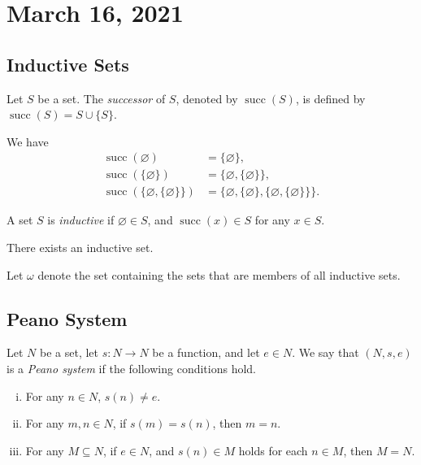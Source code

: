 \documentclass[11pt]{article}
\DeclareMathOperator{\suc}{succ}
\begin{document}
\section{March 16, 2021}
\subsection{Inductive Sets}
\begin{definition}
  Let $S$ be a set.
  The \emph{successor} of $S$, denoted by $\suc(S)$, is defined by $\suc(S) = S \cup \{S\}$.
\end{definition}

\begin{example}
  We have
  \begin{align*}
    \suc(\varnothing) &= \{\varnothing\}, \\
    \suc(\{\varnothing\}) &= \{\varnothing, \{\varnothing\}\}, \\
    \suc(\{\varnothing, \{\varnothing\}\}) &= \{\varnothing, \{\varnothing\}, \{\varnothing, \{\varnothing\}\}\}.
  \end{align*}
\end{example}

\begin{definition}
  A set $S$ is \emph{inductive} if $\varnothing \in S$, and $\suc(x) \in S$ for any $x \in S$.
\end{definition}

\begin{axiom}[Infinity]
  There exists an inductive set.
\end{axiom}

\begin{definition}
  Let $\omega$ denote the set containing the sets that are members of all inductive sets.
\end{definition}

\subsection{Peano System}
\begin{definition}
  \label{def:peano}
  Let $N$ be a set, let $s: N \to N$ be a function, and let $e \in N$.
  We say that $(N, s, e)$ is a \emph{Peano system} if the following conditions hold.
  \begin{enumerate}[(i)]
    \item For any $n \in N$, $s(n) \neq e$.
    \item For any $m, n \in N$, if $s(m) = s(n)$, then $m = n$.
    \item For any $M \subseteq N$, if $e \in N$, and $s(n) \in M$ holds for each $n \in M$, then $M = N$.
  \end{enumerate}
\end{definition}
\end{document}
